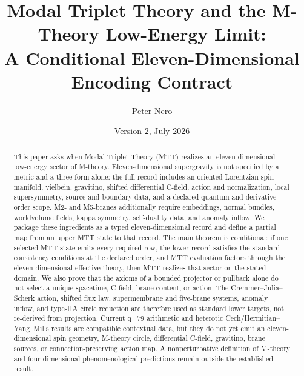 \documentclass[11pt]{article}
\title{\vspace{-1em}
Modal Triplet Theory and the M-Theory Low-Energy Limit:\\[0.25em]
\large A Conditional Eleven-Dimensional Encoding Contract}
\author{Peter Nero}
\date{Version 2, July 2026}
\theoremstyle{definition}
\theoremstyle{remark}
\begin{document}
\maketitle

\begin{abstract}
This paper asks when Modal Triplet Theory (MTT) realizes an
eleven-dimensional low-energy sector of M-theory.  Eleven-dimensional
supergravity is not specified by a metric and a three-form alone: the full
record includes an oriented Lorentzian spin manifold, vielbein, gravitino,
shifted differential C-field, action and normalization, local
supersymmetry, source and boundary data, and a declared quantum and
derivative-order scope.  M2- and M5-branes additionally require embeddings,
normal bundles, worldvolume fields, kappa symmetry, self-duality data, and
anomaly inflow.  We package these ingredients as a typed eleven-dimensional
record and define a partial map from an upper MTT state to that record.  The
main theorem is conditional: if one selected MTT state emits every required
row, the lower record satisfies the standard consistency conditions at the
declared order, and MTT evaluation factors through the eleven-dimensional
effective theory, then MTT realizes that sector on the stated domain.  We
also prove that the axioms of a bounded projector or pullback alone do not
select a unique spacetime, C-field, brane content, or action.  The
Cremmer--Julia--Scherk action, shifted flux law, supermembrane and five-brane
systems, anomaly inflow, and type-IIA circle reduction are therefore used as
standard lower targets, not re-derived from projection.  Current q=79
arithmetic and heterotic Cech/Hermitian--Yang--Mills results are compatible
contextual data, but they do not yet emit an eleven-dimensional spin
geometry, M-theory circle, differential C-field, gravitino, brane sources,
or connection-preserving action map.  A nonperturbative definition of
M-theory and four-dimensional phenomenological predictions remain outside
the established result.
\end{abstract}
\end{document}
